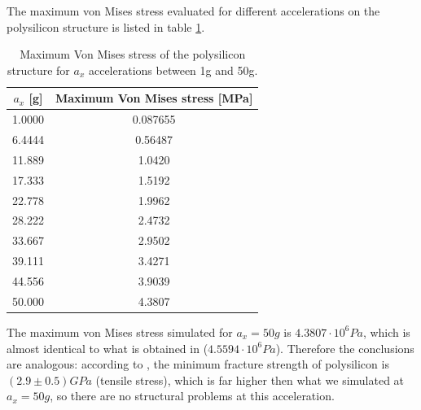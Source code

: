 \documentclass[lettersize,journal]{IEEEtran}
\begin{document}
    The maximum von Mises stress evaluated for different accelerations on the polysilicon structure is listed in table \ref{tab:max_x_stress}.
    
        \begin{table}[h]
        \caption{Maximum Von Mises stress of the polysilicon structure for \(a_x\) accelerations between 1g and 50g.}
        \renewcommand{\arraystretch}{1.5}
        \centering
        \begin{tabular}{|c|c|}
            \hline
            \textbf{\(a_x\) [g]} & \textbf{Maximum Von Mises stress [MPa]} \\ \hline
            1.0000       & 0.087655                 \\ \hline
            6.4444       & 0.56487                \\ \hline
            11.889       & 1.0420                \\ \hline
            17.333       & 1.5192                 \\ \hline
            22.778       & 1.9962                 \\ \hline
            28.222       & 2.4732                 \\ \hline
            33.667       & 2.9502                 \\ \hline
            39.111       & 3.4271                 \\ \hline
            44.556       & 3.9039                 \\ \hline
            50.000       & 4.3807                 \\ \hline
        \end{tabular}
        \label{tab:max_x_stress}
    \end{table}
    
    The maximum von Mises stress simulated for \(a_x=50g\) is \(4.3807\cdot10^6Pa\), which is almost identical to what is obtained in \cite{original} (\(4.5594\cdot10^6Pa\)). Therefore the conclusions are analogous: according to \cite{fracture}, the minimum fracture strength of polysilicon is \((2.9\pm 0.5)GPa\) (tensile stress), which is far higher then what we simulated at \(a_x=50g\), so there are no structural problems at this acceleration.
    
\end{document}
